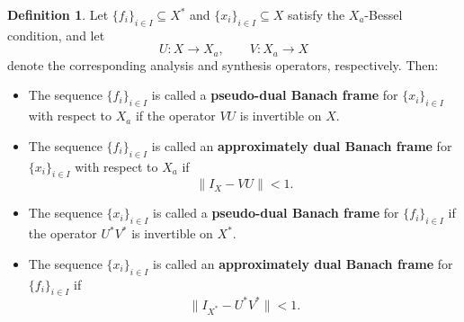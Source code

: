 \documentclass[12pt]{article}
\theoremstyle{definition}
\newtheorem{definition}[theorem]{Definition}
\theoremstyle{remark}
\begin{document}
\begin{definition}
	Let \(\{f_i\}_{i\in I}\subseteq X^*\) and
	\(\{x_i\}_{i\in I}\subseteq X\) satisfy the \(X_a\)-Bessel condition,
	and let
	\[
	U:X\to X_a,\qquad V:X_a\to X
	\]
	denote the corresponding analysis and synthesis operators, respectively.
	Then:
	
	\begin{itemize}
		\item The sequence \(\{f_i\}_{i\in I}\) is called a
		\textbf{pseudo-dual Banach frame} for \(\{x_i\}_{i\in I}\)
		with respect to \(X_a\) if the operator \(VU\) is invertible on \(X\).
		
		\item The sequence \(\{f_i\}_{i\in I}\) is called an
		\textbf{approximately dual Banach frame} for \(\{x_i\}_{i\in I}\)
		with respect to \(X_a\) if
		\[
		\|I_X-VU\|<1.
		\]
		
		\item The sequence \(\{x_i\}_{i\in I}\) is called a
		\textbf{pseudo-dual Banach frame} for \(\{f_i\}_{i\in I}\)
		if the operator \(U^*V^*\) is invertible on \(X^*\).
		
		\item The sequence \(\{x_i\}_{i\in I}\) is called an
		\textbf{approximately dual Banach frame} for \(\{f_i\}_{i\in I}\)
		if
		\[
		\|I_{X^*}-U^*V^*\|<1.
		\]
	\end{itemize}
\end{definition}
\end{document}

